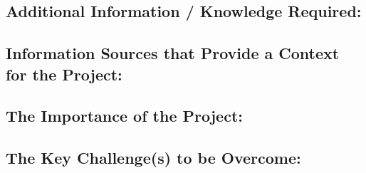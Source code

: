 \documentclass[a4paper, 12pt]{article}
\begin{document}
	\subsection[Additional Info]{Additional Information / Knowledge Required:}
	
	\subsection[Sources]{Information Sources that Provide a Context for the Project:}
	
	\subsection[Importance]{The Importance of the Project:}
	
	\subsection[Challenges]{The Key Challenge(s) to be Overcome:}
	
\end{document}
